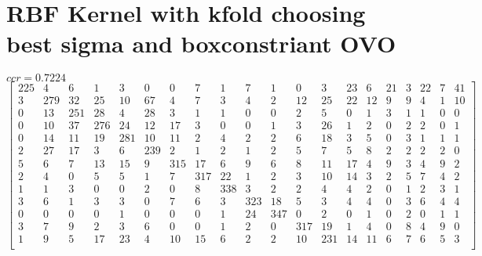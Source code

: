 \documentclass[a4paper, 11pt]{article}
\begin{document}
\section{RBF Kernel with kfold choosing best sigma and boxconstriant OVO}
\label{code:RBF_kfold}
$ccr=0.7224$
\[\begin{bmatrix}
   225  &   4  &   6  &   1   &  3  &   0 &    0  &   7  &   1  &   7  &   1 &    0  &   3  &  23  &   6  &  21  &   3  &  22  &   7  &  41 \\
     3  & 279  &  32  &  25   & 10  &  67 &    4  &   7  &   3  &   4  &   2 &   12  &  25  &  22  &  12  &   9  &   9  &   4  &   1  &  10 \\
     0  &  13  & 251  &  28   &  4  &  28 &    3  &   1  &   1  &   0  &   0 &    2  &   5  &   0  &   1  &   3  &   1  &   1  &   0  &   0 \\
     0  &  10  &  37  & 276   & 24  &  12 &   17  &   3  &   0  &   0  &   1 &    3  &  26  &   1  &   2  &   0  &   2  &   2  &   0  &   1 \\
     0  &  14  &  11  &  19   &281  &  10 &   11  &   2  &   4  &   2  &   2 &    6  &  18  &   3  &   5  &   0  &   3  &   1  &   1  &   1 \\
     2  &  27  &  17  &   3   &  6  & 239 &    2  &   1  &   2  &   1  &   2 &    5  &   7  &   5  &   8  &   2  &   2  &   2  &   2  &   0 \\
     5  &   6  &   7  &  13   & 15  &   9 &  315  &  17  &   6  &   9  &   6 &    8  &  11  &  17  &   4  &   9  &   3  &   4  &   9  &   2 \\
     2  &   4  &   0  &   5   &  5  &   1 &    7  & 317  &  22  &   1  &   2 &    3  &  10  &  14  &   3  &   2  &   5  &   7  &   4  &   2 \\
     1  &   1  &   3  &   0   &  0  &   2 &    0  &   8  & 338  &   3  &   2 &    2  &   4  &   4  &   2  &   0  &   1  &   2  &   3  &   1 \\
     3  &   6  &   1  &   3   &  3  &   0 &    7  &   6  &   3  & 323  &  18 &    5  &   3  &   4  &   4  &   0  &   3  &   6  &   4  &   4 \\
     0  &   0  &   0  &   0   &  1  &   0 &    0  &   0  &   1  &  24  & 347 &    0  &   2  &   0  &   1  &   0  &   2  &   0  &   1  &   1 \\
     3  &   7  &   9  &   2   &  3  &   6 &    0  &   0  &   1  &   2  &   0 &  317  &  19  &   1  &   4  &   0  &   8  &   4  &   9  &   0 \\
     1  &   9  &   5  &  17   & 23  &   4 &   10  &  15  &   6  &   2  &   2 &   10  & 231  &  14  &  11  &   6  &   7  &   6  &   5  &   3 \\

\end{bmatrix}\]
\end{document}
